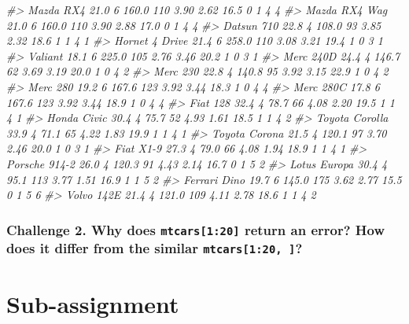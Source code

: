 \documentclass[]{book}
\newenvironment{Shaded}{\begin{snugshade}}{\end{snugshade}}
\newcommand{\CommentTok}[1]{\textcolor[rgb]{0.56,0.35,0.01}{\textit{#1}}}
\begin{document}
\begin{Shaded}
\begin{Highlighting}[]
\CommentTok{#> Mazda RX4      21.0   6 160.0 110 3.90 2.62 16.5  0  1    4    4}
\CommentTok{#> Mazda RX4 Wag  21.0   6 160.0 110 3.90 2.88 17.0  0  1    4    4}
\CommentTok{#> Datsun 710     22.8   4 108.0  93 3.85 2.32 18.6  1  1    4    1}
\CommentTok{#> Hornet 4 Drive 21.4   6 258.0 110 3.08 3.21 19.4  1  0    3    1}
\CommentTok{#> Valiant        18.1   6 225.0 105 2.76 3.46 20.2  1  0    3    1}
\CommentTok{#> Merc 240D      24.4   4 146.7  62 3.69 3.19 20.0  1  0    4    2}
\CommentTok{#> Merc 230       22.8   4 140.8  95 3.92 3.15 22.9  1  0    4    2}
\CommentTok{#> Merc 280       19.2   6 167.6 123 3.92 3.44 18.3  1  0    4    4}
\CommentTok{#> Merc 280C      17.8   6 167.6 123 3.92 3.44 18.9  1  0    4    4}
\CommentTok{#> Fiat 128       32.4   4  78.7  66 4.08 2.20 19.5  1  1    4    1}
\CommentTok{#> Honda Civic    30.4   4  75.7  52 4.93 1.61 18.5  1  1    4    2}
\CommentTok{#> Toyota Corolla 33.9   4  71.1  65 4.22 1.83 19.9  1  1    4    1}
\CommentTok{#> Toyota Corona  21.5   4 120.1  97 3.70 2.46 20.0  1  0    3    1}
\CommentTok{#> Fiat X1-9      27.3   4  79.0  66 4.08 1.94 18.9  1  1    4    1}
\CommentTok{#> Porsche 914-2  26.0   4 120.3  91 4.43 2.14 16.7  0  1    5    2}
\CommentTok{#> Lotus Europa   30.4   4  95.1 113 3.77 1.51 16.9  1  1    5    2}
\CommentTok{#> Ferrari Dino   19.7   6 145.0 175 3.62 2.77 15.5  0  1    5    6}
\CommentTok{#> Volvo 142E     21.4   4 121.0 109 4.11 2.78 18.6  1  1    4    2}
\end{Highlighting}
\end{Shaded}

\subsubsection*{\texorpdfstring{Challenge 2. Why does
\texttt{mtcars{[}1:20{]}} return an error? How does it differ from the
similar
\texttt{mtcars{[}1:20,\ {]}}?}{Challenge 2. Why does mtcars{[}1:20{]} return an error? How does it differ from the similar mtcars{[}1:20, {]}?}}\label{challenge-2.-why-does-mtcars120-return-an-error-how-does-it-differ-from-the-similar-mtcars120}

\section{Sub-assignment}\label{sub-assignment}
\end{document}

